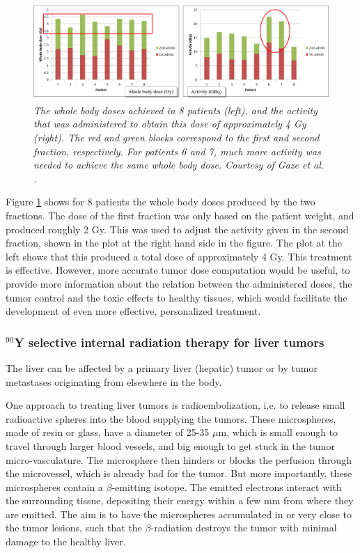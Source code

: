 \documentclass[11pt,oneside]{article}
\begin{document}
\begin{figure}[tb]
\centering
\includegraphics[width=\textwidth]{figs/fig_mIBG.png}
\caption{\label{fig:mibg} \emph{The whole body doses achieved in 8
    patients (left), and the activity that was administered to obtain
    this dose of approximately 4 Gy (right). The red and green blocks
    correspond to the first and second fraction, respectively. For
    patients 6 and 7, much more activity was needed to achieve the
    same whole body dose. Courtesy of Gaze et al. \cite{Sangro2012}.}}
\end{figure}
%
Figure \ref{fig:mibg} shows for 8 patients the whole body doses
produced by the two fractions. The dose of the first fraction was only
based on the patient weight, and produced roughly 2 Gy. This was used
to adjust the activity given in the second fraction, shown in the plot at
the right hand side in the figure. The plot at the left shows that
this produced a total dose of approximately 4 Gy. This treatment is
effective. However, more accurate tumor dose computation would be
useful, to provide more information about the relation between the
administered doses, the tumor control and the toxic effects to healthy
tissues, which would facilitate the development of even more effective,
personalized treatment.


\subsubsection{$^{90}$Y selective internal radiation therapy for liver tumors}
The liver can be affected by a primary liver (hepatic) tumor or by
tumor metastases originating from elsewhere in the body.

One approach to treating liver tumors is radioembolization, i.e. to
release small radioactive spheres into the blood supplying the
tumors. These microspheres, made of resin or glass, have a diameter of
25-35 $\mu$m, which is small enough to travel through larger blood
vessels, and big enough to get stuck in the tumor
micro-vasculature. The microsphere then hinders or blocks the
perfusion through the microvessel, which is already bad for the
tumor. But more importantly, these microspheres contain a
$\beta$-emitting isotope. The emitted electrons interact with the
surrounding tissue, depositing their energy within a few mm from where
they are emitted. The aim is to have the microspheres accumulated in
or very close to the tumor lesions, such that the $\beta$-radiation
destroys the tumor with minimal damage to the healthy liver.
\end{document}
